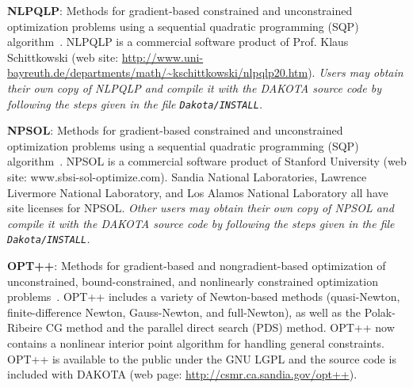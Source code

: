 \textbf{NLPQLP}: Methods for gradient-based constrained and
unconstrained optimization problems using a sequential quadratic
programming (SQP) algorithm~\cite{Sch04}.  NLPQLP is a commercial
software product of Prof. Klaus Schittkowski (web site:
\url{http://www.uni-bayreuth.de/departments/math/~kschittkowski/nlpqlp20.htm}).
\emph{Users may obtain their own copy of NLPQLP and compile it with the
DAKOTA source code by following the steps given in the file {\tt Dakota/INSTALL}.}

\textbf{NPSOL}: Methods for gradient-based constrained and
unconstrained optimization problems using a sequential quadratic
programming (SQP) algorithm~\cite{Gil86}. NPSOL is a commercial software
product of Stanford University (web site: www.sbsi-sol-optimize.com).
Sandia National Laboratories, Lawrence Livermore National Laboratory,
and Los Alamos National Laboratory all have site licenses for NPSOL.
\emph{Other users may obtain their own copy of NPSOL and compile it
with the DAKOTA source code by following the steps given in the file
{\tt Dakota/INSTALL}.}

\textbf{OPT++}: Methods for gradient-based and nongradient-based
optimization of unconstrained, bound-constrained, and nonlinearly
constrained optimization problems~\cite{MeOlHoWi07}. OPT++ includes a
variety of Newton-based methods (quasi-Newton, finite-difference
Newton, Gauss-Newton, and full-Newton), as well as the Polak-Ribeire
CG method and the parallel direct search (PDS) method. OPT++ now
contains a nonlinear interior point algorithm for handling general
constraints.  OPT++ is available to the public under the GNU LGPL and
the source code is included with DAKOTA (web page:
\url{http://csmr.ca.sandia.gov/opt++}).



